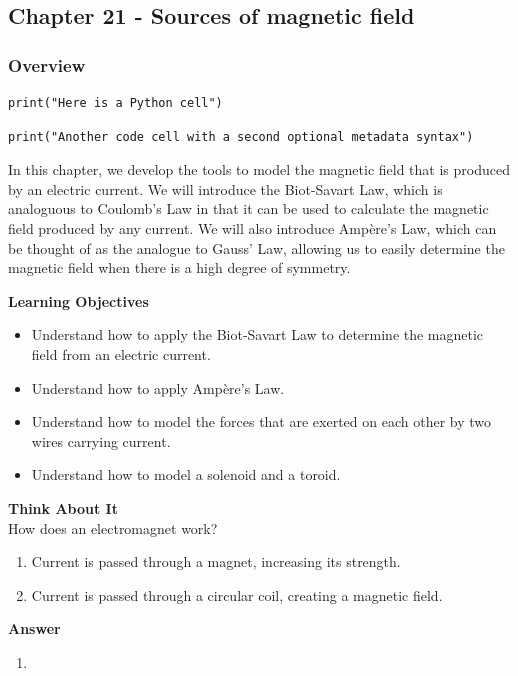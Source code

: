 \subsection{Chapter 21 - Sources of magnetic field}

\subsubsection{Overview}\label{chapter:magneticsource}

\begin{verbatim}
print("Here is a Python cell")
\end{verbatim}

\begin{verbatim}
print("Another code cell with a second optional metadata syntax")
\end{verbatim}

In this chapter, we develop the tools to model the magnetic field that is produced by an electric current. We will introduce the Biot-Savart Law, which is analoguous to Coulomb's Law in that it can be used to calculate the magnetic field produced by any current. We will also introduce Ampère's Law, which can be thought of as the analogue to Gauss' Law, allowing us to easily determine the magnetic field when there is a high degree of symmetry.

\begin{framed}
\textbf{Learning Objectives}\\
\begin{itemize}
\item Understand how to apply the Biot-Savart Law to determine the magnetic field from an electric current.
\item Understand how to apply Ampère's Law.
\item Understand how to model the forces that are exerted on each other by two wires carrying current.
\item Understand how to model a solenoid and a toroid.
\end{itemize}
\end{framed}

\begin{framed}
\textbf{Think About It}\\
How does an electromagnet work?

\begin{enumerate}
\item Current is passed through a magnet, increasing its strength.
\item Current is passed through a circular coil, creating a magnetic field.
\end{enumerate}

\begin{framed}
\textbf{Answer}\\
\begin{enumerate}[resume]
\item
\end{enumerate}
\end{framed}
\end{framed}


